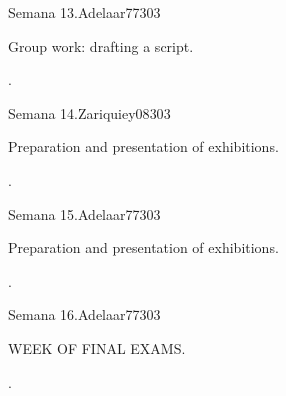 \begin{syllabus}
\begin{unit}{Semana 13.}{}{Adelaar77}{30}{3}
   \begin{topics}
      \item Group work: drafting a script.
   \end{topics}

   \begin{learningoutcomes}
      \item .
   \end{learningoutcomes}
\end{unit}

\begin{unit}{Semana 14.}{}{Zariquiey08}{30}{3}
   \begin{topics}
      \item Preparation and presentation of exhibitions.
   \end{topics}

   \begin{learningoutcomes}
      \item .
   \end{learningoutcomes}
\end{unit}

\begin{unit}{Semana 15.}{}{Adelaar77}{30}{3}
   \begin{topics}
      \item Preparation and presentation of exhibitions.
   \end{topics}

   \begin{learningoutcomes}
      \item .
   \end{learningoutcomes}
\end{unit}

\begin{unit}{Semana 16.}{}{Adelaar77}{30}{3}
   \begin{topics}
      \item WEEK OF FINAL EXAMS.
   \end{topics}

   \begin{learningoutcomes}
      \item .
   \end{learningoutcomes}
\end{unit}



\begin{coursebibliography}
\end{coursebibliography}

\end{syllabus}
